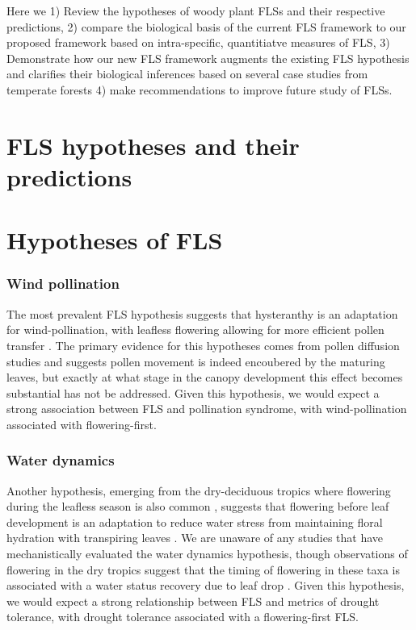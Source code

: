 \documentclass{article}
\begin{document}
 Here we 1) Review the hypotheses of woody plant FLSs and their respective predictions, 2) compare the biological basis of the current FLS framework to our proposed framework based on intra-specific, quantitiatve measures of FLS, 3)  Demonstrate how our new FLS framework augments the existing FLS hypothesis and clarifies their biological inferences based on several case studies from temperate forests 4) make recommendations to improve future study of FLSs.
\section*{FLS hypotheses and their predictions}
\section*{Hypotheses of FLS}
\subsubsection*{ Wind pollination}
\indent\indent The most prevalent FLS hypothesis suggests that hysteranthy is an adaptation for wind-pollination, with leafless flowering allowing for more efficient pollen transfer \citep{Whitehead1969, Spurr1980,Friedman2009}. The primary evidence for this hypotheses comes from pollen diffusion studies \citep[e.g., particle movement through closed and open canopies][]{Niklas1985,Nathan2005, Milleron2012} and suggests pollen movement is indeed encoubered by the maturing leaves, but exactly at what stage in the canopy development this effect becomes substantial has not be addressed. Given this hypothesis, we would expect a strong association between FLS and pollination syndrome, with wind-pollination associated with flowering-first.

\subsubsection*{Water dynamics}
\indent\indent Another hypothesis, emerging from the dry-deciduous tropics where flowering during the leafless season is also common \citep{Janzen1967}, suggests that flowering before leaf development is an adaptation to reduce water stress from maintaining floral hydration with transpiring leaves \citep{Franklin2016}. We are unaware of any studies that have mechanistically evaluated the water dynamics hypothesis, though observations of flowering in the dry tropics suggest that the timing of flowering in these taxa is associated with a water status recovery due to leaf drop \citep{Borchert1983,Reich1984}. Given this hypothesis, we would expect a strong relationship between FLS and metrics of drought tolerance, with drought tolerance associated with a flowering-first FLS.  
\end{document}
